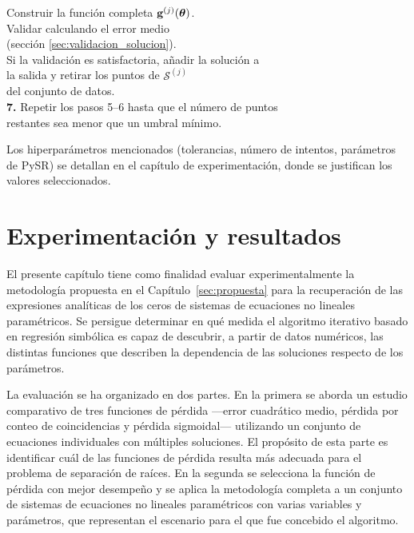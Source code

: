 \documentclass[12pt,a4paper]{article} \usepackage[utf8]{inputenc} \usepackage[spanish]{babel} \usepackage{amsmath, amssymb, amsthm} \usepackage{bm} \usepackage{float} \usepackage{longtable} \usepackage[hidelinks]{hyperref}
\begin{document}
\begin{tabbing}
\> \qquad Construir la función completa \(\mathbf{g}^{(j)}(\boldsymbol{\theta})\). \\
\> \qquad Validar calculando el error medio \\ \> \qquad (sección \ref{sec:validacion_solucion}). \\ \> \qquad Si la validación es satisfactoria, añadir la solución a \\
\> \qquad la salida y retirar los puntos de \(\mathcal{S}^{(j)}\) \\
\> \qquad del conjunto de datos. \\ \textbf{7.} \> Repetir los pasos 5--6 hasta que el número de puntos \\ \> restantes sea menor que un umbral mínimo.
\end{tabbing}
\medskip

Los hiperparámetros mencionados (tolerancias, número de intentos, parámetros de PySR) se detallan en el capítulo de experimentación, donde se justifican los valores seleccionados.

\newpage

\section{Experimentación y resultados}
\label{sec:experimentacion}

El presente capítulo tiene como finalidad evaluar experimentalmente la metodología propuesta en el Capítulo~\ref{sec:propuesta} para la recuperación de las expresiones analíticas de los ceros de sistemas de ecuaciones no lineales paramétricos. Se persigue determinar en qué medida el algoritmo iterativo basado en regresión simbólica es capaz de descubrir, a partir de datos numéricos, las distintas funciones que describen la dependencia de las soluciones respecto de los parámetros.

La evaluación se ha organizado en dos partes. En la primera se aborda un estudio comparativo de tres funciones de pérdida —error cuadrático medio, pérdida por conteo de coincidencias y pérdida sigmoidal— utilizando un conjunto de ecuaciones individuales con múltiples soluciones. El propósito de esta parte es identificar cuál de las funciones de pérdida resulta más adecuada para el problema de separación de raíces. En la segunda se selecciona la función de pérdida con mejor desempeño y se aplica la metodología completa a un conjunto de sistemas de ecuaciones no lineales paramétricos con varias variables y parámetros, que representan el escenario para el que fue concebido el algoritmo.
\end{document}
